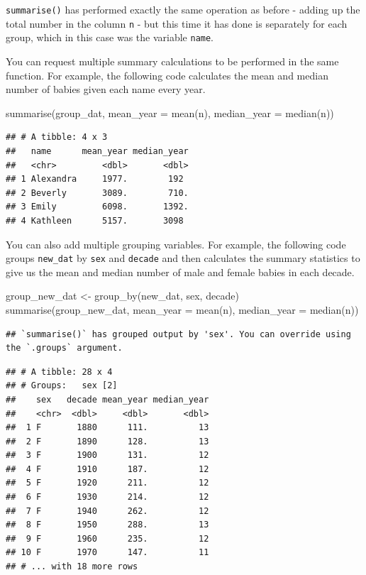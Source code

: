 \documentclass[
  oneside]{book}
\newenvironment{Shaded}{\begin{snugshade}}{\end{snugshade}}
\newcommand{\AttributeTok}[1]{\textcolor[rgb]{0.77,0.63,0.00}{#1}}
\newcommand{\FunctionTok}[1]{\textcolor[rgb]{0.00,0.00,0.00}{#1}}
\newcommand{\NormalTok}[1]{#1}
\newcommand{\OtherTok}[1]{\textcolor[rgb]{0.56,0.35,0.01}{#1}}
\begin{document}
\texttt{summarise()} has performed exactly the same operation as before - adding up the total number in the column \texttt{n} - but this time it has done is separately for each group, which in this case was the variable \texttt{name}.

You can request multiple summary calculations to be performed in the same function. For example, the following code calculates the mean and median number of babies given each name every year.

\begin{Shaded}
\begin{Highlighting}[]
\FunctionTok{summarise}\NormalTok{(group\_dat,}
          \AttributeTok{mean\_year =} \FunctionTok{mean}\NormalTok{(n),}
          \AttributeTok{median\_year =} \FunctionTok{median}\NormalTok{(n))}
\end{Highlighting}
\end{Shaded}

\begin{verbatim}
## # A tibble: 4 x 3
##   name      mean_year median_year
##   <chr>         <dbl>       <dbl>
## 1 Alexandra     1977.        192 
## 2 Beverly       3089.        710.
## 3 Emily         6098.       1392.
## 4 Kathleen      5157.       3098
\end{verbatim}

You can also add multiple grouping variables. For example, the following code groups \texttt{new\_dat} by \texttt{sex} and \texttt{decade} and then calculates the summary statistics to give us the mean and median number of male and female babies in each decade.

\begin{Shaded}
\begin{Highlighting}[]
\NormalTok{group\_new\_dat }\OtherTok{\textless{}{-}} \FunctionTok{group\_by}\NormalTok{(new\_dat, sex, decade)}
\FunctionTok{summarise}\NormalTok{(group\_new\_dat,}
          \AttributeTok{mean\_year =} \FunctionTok{mean}\NormalTok{(n),}
          \AttributeTok{median\_year =} \FunctionTok{median}\NormalTok{(n))}
\end{Highlighting}
\end{Shaded}

\begin{verbatim}
## `summarise()` has grouped output by 'sex'. You can override using the `.groups` argument.
\end{verbatim}

\begin{verbatim}
## # A tibble: 28 x 4
## # Groups:   sex [2]
##    sex   decade mean_year median_year
##    <chr>  <dbl>     <dbl>       <dbl>
##  1 F       1880      111.          13
##  2 F       1890      128.          13
##  3 F       1900      131.          12
##  4 F       1910      187.          12
##  5 F       1920      211.          12
##  6 F       1930      214.          12
##  7 F       1940      262.          12
##  8 F       1950      288.          13
##  9 F       1960      235.          12
## 10 F       1970      147.          11
## # ... with 18 more rows
\end{verbatim}
\end{document}
